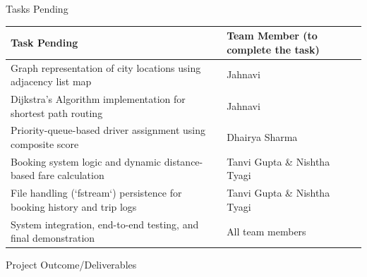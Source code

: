 \documentclass[12pt,a4paper]{article}
\newcommand{\sectiontitle}[1]{%
    {\color{GEUBlue}
    \fontsize{18}{22}\selectfont #1}
}
\begin{document}
\vspace{0.65cm}

\sectiontitle{Tasks Pending}

\vspace{0.05cm}

\vspace{0.18cm}

\begin{tabularx}{\textwidth}{
|>{\RaggedRight\arraybackslash}X
|>{\RaggedRight\arraybackslash}p{}|
}
\hline

\textbf{Task Pending} &
\textbf{Team Member (to complete the task)} \\
\hline

Graph representation of city locations using adjacency list map &
Jahnavi \\
\hline

Dijkstra's Algorithm implementation for shortest path routing &
Jahnavi \\
\hline

Priority-queue-based driver assignment using composite score &
Dhairya Sharma \\
\hline

Booking system logic and dynamic distance-based fare calculation &
Tanvi Gupta \& Nishtha Tyagi \\
\hline

File handling (`fstream`) persistence for booking history and trip logs &
Tanvi Gupta \& Nishtha Tyagi \\
\hline

System integration, end-to-end testing, and final demonstration &
All team members \\
\hline

\end{tabularx}

\newpage

\vspace*{0.30cm}

\sectiontitle{Project Outcome/Deliverables}

\vspace{0.05cm}

\vspace{0.35cm}
\end{document}
